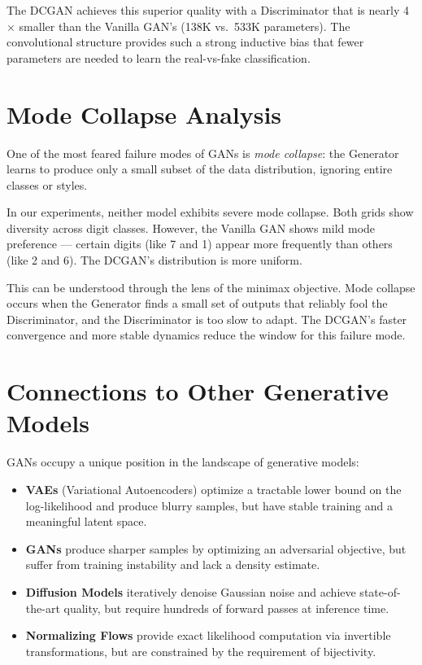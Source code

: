 \documentclass[12pt]{article}
\begin{document}
The DCGAN achieves this superior quality with a Discriminator that is nearly 4$\times$ smaller than the Vanilla GAN's (138K vs.\ 533K parameters). The convolutional structure provides such a strong inductive bias that fewer parameters are needed to learn the real-vs-fake classification.

\section{Mode Collapse Analysis}
One of the most feared failure modes of GANs is \textit{mode collapse}: the Generator learns to produce only a small subset of the data distribution, ignoring entire classes or styles.

In our experiments, neither model exhibits severe mode collapse. Both grids show diversity across digit classes. However, the Vanilla GAN shows mild mode preference --- certain digits (like 7 and 1) appear more frequently than others (like 2 and 6). The DCGAN's distribution is more uniform.

This can be understood through the lens of the minimax objective. Mode collapse occurs when the Generator finds a small set of outputs that reliably fool the Discriminator, and the Discriminator is too slow to adapt. The DCGAN's faster convergence and more stable dynamics reduce the window for this failure mode.

\section{Connections to Other Generative Models}
GANs occupy a unique position in the landscape of generative models:

\begin{itemize}
    \item \textbf{VAEs} (Variational Autoencoders) optimize a tractable lower bound on the log-likelihood and produce blurry samples, but have stable training and a meaningful latent space.
    \item \textbf{GANs} produce sharper samples by optimizing an adversarial objective, but suffer from training instability and lack a density estimate.
    \item \textbf{Diffusion Models} iteratively denoise Gaussian noise and achieve state-of-the-art quality, but require hundreds of forward passes at inference time.
    \item \textbf{Normalizing Flows} provide exact likelihood computation via invertible transformations, but are constrained by the requirement of bijectivity.
\end{itemize}
\end{document}

